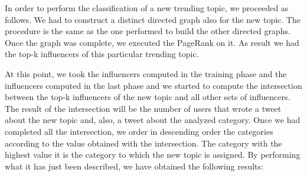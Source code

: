 \documentclass[journal,11pt]{vgtc}
\begin{document}
In order to perform the classification of a new trending topic, we proceeded as follows.
We had to construct a distinct directed graph also for the new topic. The procedure is the same as the one performed
to build the other directed graphs. Once the graph was complete, we executed the PageRank on it.
As result we had the top-k influencers of this particular trending topic.

At this point, we took the influencers computed in the training phase and the influencers computed in the
last phase and we started to compute the intersection between the top-k influencers of the new topic and
all other sets of influencers.
The result of the intersection will be the number of users that wrote a tweet about the new topic and, also,
a tweet about the analyzed category.
Once we had completed all the intersection, we order in descending order the categories according to the
value obtained with the intersection. The category with the highest value it is the category
to which the new topic is assigned.
By performing what it has just been described, we have obtained the following results:




\end{document}
